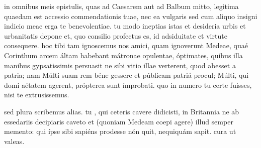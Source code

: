 


 in omnibus meis epistulis, quas ad Caesarem aut ad Balbum mitto, legitima quaedam est accessio commendationis tuae, nec ea vulgaris sed cum aliquo insigni indicio meae erga te benevolentiae. tu modo ineptias istas et desideria urbis et urbanitatis depone et, quo consilio profectus es, id adsiduitate et virtute consequere. hoc tibi tam ignoscemus nos amici, quam ignoverunt Medeae, quaé Corinthum arcem áltam habebant mátronae opulentae, óptimates, quibus illa manibus gypsatissimis persuasit ne sibi vitio illae verterent, quod abesset a patria; nam Múlti suam rem béne gessere et públicam patriá procul; Múlti, qui domi aétatem agerent, própterea sunt ímprobati. quo in numero tu certe fuisses, nisi te extrusissemus.

 sed plura scribemus alias. tu , qui ceteris cavere didicisti, in Britannia ne ab essedariis decipiaris caveto et (quoniam Medeam coepi agere) illud semper memento: qui ípse sibi sapiéns prodesse nón quit, nequiquám sapit. cura ut valeas.
